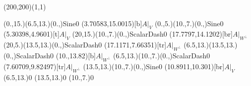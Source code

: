\unitlength=1bp%

\begin{feynartspicture}(200,200)(1,1)

\FADiagram{}
\FAProp(0.,15.)(6.5,13.)(0.,){Sine}{0}
\FALabel(3.70583,15.0015)[b]{$A|_V$}
\FAProp(0.,5.)(10.,7.)(0.,){Sine}{0}
\FALabel(5.30398,4.9601)[t]{$A|_V$}
\FAProp(20,15.)(10.,7.)(0.,){ScalarDash}{0}
\FALabel(17.7797,14.1202)[br]{$A|_{W^\perp}$}
\FAProp(20,5.)(13.5,13.)(0.,){ScalarDash}{0}
\FALabel(17.1171,7.66351)[tr]{$A|_{W^\perp}$}
\FAProp(6.5,13.)(13.5,13.)(0.,){ScalarDash}{0}
\FALabel(10.,13.82)[b]{$A|_{W^\perp}$}
\FAProp(6.5,13.)(10.,7.)(0.,){ScalarDash}{0}
\FALabel(7.60709,9.82497)[tr]{$A|_{W^\perp}$}
\FAProp(13.5,13.)(10.,7.)(0.,){Sine}{0}
\FALabel(10.8911,10.301)[br]{$A|_V$}
\FAVert(6.5,13.){0}
\FAVert(13.5,13.){0}
\FAVert(10.,7.){0}
\end{feynartspicture}

